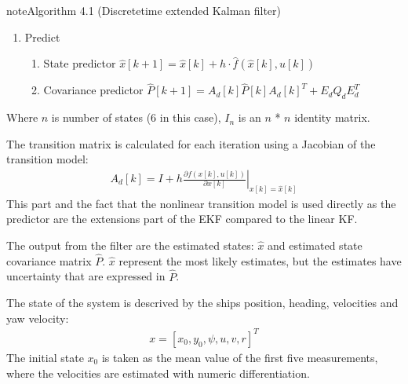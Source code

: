 \documentclass[review]{elsarticle}
\begin{document}
\begin{sphinxadmonition}{note}{Algorithm 4.1 (Discrete\sphinxhyphen{}time extended Kalman filter)}
\begin{enumerate}
\begin{enumerate}
\item {} 
\sphinxAtStartPar
Predict
\begin{enumerate}
%
\item {} 
\sphinxAtStartPar
State predictor
\(\hat{x}[k+1] = \hat{x}[k] + h \cdot \hat{f}(\hat{x}[k], u[k])\)

\item {} 
\sphinxAtStartPar
Covariance predictor
\(\hat{P}[k+1] = A_d[k]  \hat{P}[k] A_d[k]^T + E_d Q_d E_d^T \)

\end{enumerate}

\end{enumerate}

\end{enumerate}
\end{sphinxadmonition}

\sphinxAtStartPar
Where \(n\) is number of states (6 in this case), \(I_n\) is an \(n\) * \(n\) identity matrix.

\sphinxAtStartPar
The transition matrix is calculated for each iteration using a Jacobian of the transition model:
\begin{equation}\label{equation:04.01_EK:eqjacobi}
\begin{split}A_d[k] = I + h \left. \frac{\partial f \left(x[k],u[k] \right)}{\partial x[k]} \right|_{x[k]=\hat{x}[k]}\end{split}
\end{equation}
\sphinxAtStartPar
This part and the fact that the nonlinear transition model is used directly as the predictor are the extensions part of the EKF compared to the linear KF.

\sphinxAtStartPar
The output from the filter are the estimated states: \(\hat{x}\) and estimated state covariance matrix \(\hat{P}\). \(\hat{x}\) represent the most likely estimates, but the estimates have uncertainty that are expressed in \(\hat{P}\).

\sphinxAtStartPar
The state of the system is descrived by the ships position, heading, velocities and yaw velocity:
\begin{equation}\label{equation:04.01_EK:eqstates}
\begin{split}x = [x_0,y_0,\psi,u,v,r]^T\end{split}
\end{equation}
\sphinxAtStartPar
The initial state \(x_0\) is taken as the mean value of the first five measurements, where the velocities are estimated with numeric differentiation.
\end{document}
